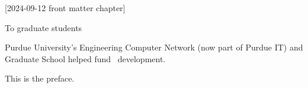 [2024-09-12 front matter chapter]
%
%
%
%
%
%

%
%
%
\begin{statement}
\end{statement}

\begin{dedication}
  To graduate students
\end{dedication}

\begin{acknowledgments}
  Purdue University's Engineering Computer Network
  (now part of Purdue IT)
  and Graduate School helped fund \PurdueThesisLogo\ development.
\end{acknowledgments}

\begin{preface}
  This is the preface.
\end{preface}

